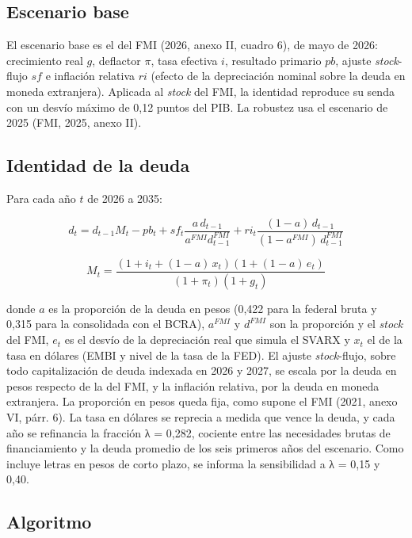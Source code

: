 \subsection{Escenario base}

El escenario base es el del FMI (2026, anexo II, cuadro 6), de mayo de
2026: crecimiento real \(g\), deflactor \(\pi\), tasa efectiva \(i\),
resultado primario \(pb\), ajuste \emph{stock}-flujo \(sf\) e inflación
relativa \(ri\) (efecto de la depreciación nominal sobre la deuda en
moneda extranjera). Aplicada al \emph{stock} del FMI, la identidad
reproduce su senda con un desvío máximo de 0,12 puntos del PIB. La
robustez usa el escenario de 2025 (FMI, 2025, anexo II).

\subsection{Identidad de la deuda}

Para cada año \(t\) de 2026 a 2035:

\[d_t = d_{t-1} M_t - pb_t + sf_t \frac{a\, d_{t-1}}{a^{FMI} d^{FMI}_{t-1}} + ri_t \frac{(1-a)\, d_{t-1}}{(1-a^{FMI})\, d^{FMI}_{t-1}}\]

\[M_t = \frac{\left(1 + i_t + (1-a)\, x_t\right)\left(1 + (1-a)\, e_t\right)}{(1+\pi_t)(1+g_t)}\]

donde \(a\) es la proporción de la deuda en pesos (0,422 para la federal
bruta y 0,315 para la consolidada con el BCRA), \(a^{FMI}\) y
\(d^{FMI}\) son la proporción y el \emph{stock} del FMI, \(e_t\) es el
desvío de la depreciación real que simula el SVARX y \(x_t\) el de la
tasa en dólares (EMBI y nivel de la tasa de la FED). El ajuste
\emph{stock}-flujo, sobre todo capitalización de deuda indexada en 2026
y 2027, se escala por la deuda en pesos respecto de la del FMI, y la
inflación relativa, por la deuda en moneda extranjera. La proporción en
pesos queda fija, como supone el FMI (2021, anexo VI, párr. 6). La tasa
en dólares se reprecia a medida que vence la deuda, y cada año se
refinancia la fracción λ = 0,282, cociente entre las necesidades brutas
de financiamiento y la deuda promedio de los seis primeros años del
escenario. Como incluye letras en pesos de corto plazo, se informa la
sensibilidad a λ = 0,15 y 0,40.

\subsection{Algoritmo}

